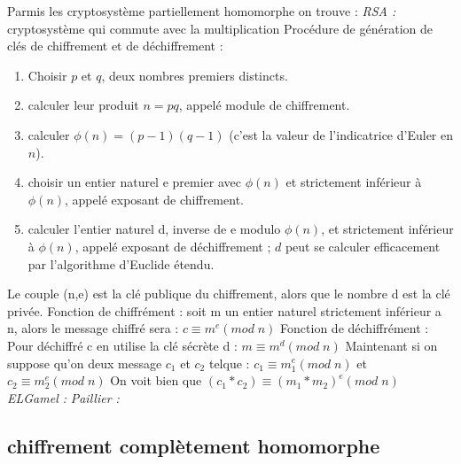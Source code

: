 \documentclass[a4paper,11pt]{report}
\begin{document}
Parmis les cryptosystème partiellement homomorphe on trouve :\newline
\textit{RSA : } cryptosystème qui commute avec la multiplication\newline
Procédure de génération de clés de chiffrement et de déchiffrement :
\begin{enumerate}
\item Choisir $p$ et $q$, deux nombres premiers distincts.
\item calculer leur produit $n = pq$, appelé module de chiffrement.
\item calculer $\phi(n) = (p - 1)(q -1)$ (c'est la valeur de l'indicatrice d'Euler en $n$).
\item choisir un entier naturel e premier avec $\phi(n)$ et strictement inférieur à $\phi(n)$, appelé exposant de chiffrement.
\item calculer l'entier naturel d, inverse de e modulo $\phi(n)$, et strictement inférieur à $\phi(n)$, appelé exposant de déchiffrement ; $d$ peut se calculer efficacement par l'algorithme d'Euclide étendu.
\end{enumerate}
Le couple (n,e) est la clé publique du chiffrement, alors que le nombre d est la clé privée.\newline
Fonction de chiffrément :\newline 
soit m un entier naturel strictement inférieur a n, alors le message chiffré sera :\newline
$c \equiv m^e(mod\; n)$\newline
Fonction de déchiffrément :\newline
Pour déchiffré c en utilise la clé sécrète d :\newline
$m \equiv m^d(mod\; n)$\newline
Maintenant si on suppose qu'on deux message $c_1$ et $c_2$ telque :
$c_1 \equiv m_1^e(mod\; n)$ et $c_2 \equiv m_2^e(mod\; n)$ \newline
On voit bien que $(c_1*c_2) \equiv (m_1*m_2)^e(mod\; n)$
\textit{ELGamel : }\newline
\textit{Paillier : }\newline
\subsection{chiffrement complètement homomorphe}
\end{document}

